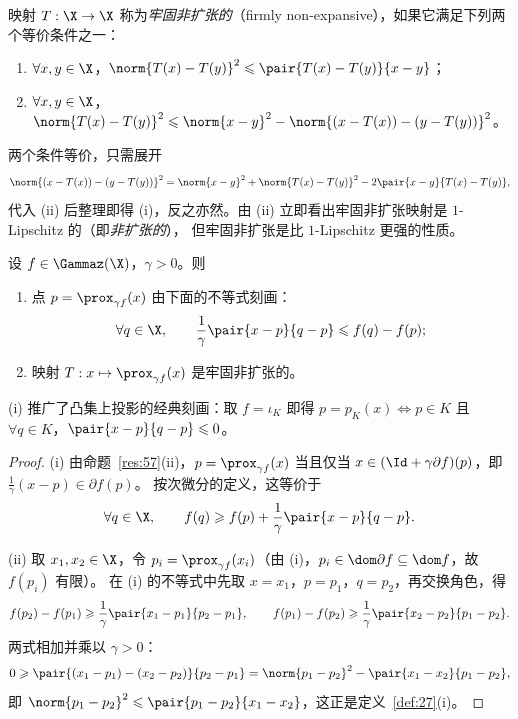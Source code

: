 \begin{definition}[牢固非扩张]
\label{def:27}
映射 $T:\X\to\X$ 称为\emph{牢固非扩张的}（firmly non-expansive），如果它满足下列两个等价条件之一：
\begin{enumerate}[label=(\roman*)]
  \item $\forall x,y\in\X$，$\norm{T(x)-T(y)}^2\leqslant\pair{T(x)-T(y)}{x-y}$；
  \item $\forall x,y\in\X$，$\norm{T(x)-T(y)}^2\leqslant\norm{x-y}^2-\norm{(x-T(x))-(y-T(y))}^2$。
\end{enumerate}
\end{definition}

两个条件等价，只需展开
\[
  \norm{(x-T(x))-(y-T(y))}^2=\norm{x-y}^2+\norm{T(x)-T(y)}^2-2\pair{x-y}{T(x)-T(y)} ,
\]
代入 (ii) 后整理即得 (i)，反之亦然。由 (ii) 立即看出牢固非扩张映射是 $1$-Lipschitz 的（即\emph{非扩张的}），
但牢固非扩张是比 $1$-Lipschitz 更强的性质。

\begin{proposition}
\label{res:58}
设 $f\in\Gammaz(\X)$，$\gamma>0$。则
\begin{enumerate}[label=(\roman*)]
  \item 点 $p=\prox_{\gamma f}(x)$ 由下面的不等式刻画：
  \[
    \forall q\in\X,\qquad \frac1\gamma\pair{x-p}{q-p}\leqslant f(q)-f(p);
  \]
  \item 映射 $T:x\mapsto\prox_{\gamma f}(x)$ 是牢固非扩张的。
\end{enumerate}
\end{proposition}

(i) 推广了凸集上投影的经典刻画：取 $f=\iota_K$ 即得 $p=p_K(x)\iff p\in K$ 且 $\forall q\in K$，$\pair{x-p}{q-p}\leqslant0$。

\begin{proof}
(i) 由命题~\ref{res:57}(ii)，$p=\prox_{\gamma f}(x)$ 当且仅当 $x\in(\Id+\gamma\partial f)(p)$，即 $\frac1\gamma(x-p)\in\partial f(p)$。
按次微分的定义，这等价于
\[
  \forall q\in\X,\qquad f(q)\geqslant f(p)+\frac1\gamma\pair{x-p}{q-p}.
\]

(ii) 取 $x_1,x_2\in\X$，令 $p_i=\prox_{\gamma f}(x_i)$（由 (i)，$p_i\in\dom\partial f\subseteq\dom f$，故 $f(p_i)$ 有限）。
在 (i) 的不等式中先取 $x=x_1$，$p=p_1$，$q=p_2$，再交换角色，得
\[
  f(p_2)-f(p_1)\geqslant\frac1\gamma\pair{x_1-p_1}{p_2-p_1},\qquad
  f(p_1)-f(p_2)\geqslant\frac1\gamma\pair{x_2-p_2}{p_1-p_2}.
\]
两式相加并乘以 $\gamma>0$：
\[
  0\geqslant\pair{(x_1-p_1)-(x_2-p_2)}{p_2-p_1}=\norm{p_1-p_2}^2-\pair{x_1-x_2}{p_1-p_2},
\]
即 $\norm{p_1-p_2}^2\leqslant\pair{p_1-p_2}{x_1-x_2}$，这正是定义~\ref{def:27}(i)。
\end{proof}


